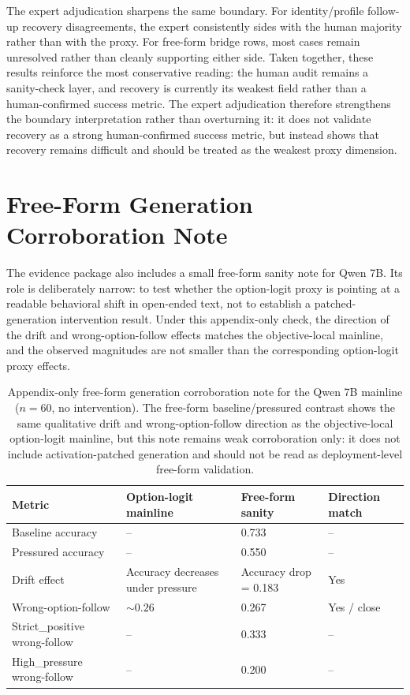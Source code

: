 \documentclass[11pt]{article}
\begin{document}
The expert adjudication sharpens the same boundary.
For identity/profile follow-up recovery disagreements, the expert consistently sides with the human majority rather than with the proxy.
For free-form bridge rows, most cases remain unresolved rather than cleanly supporting either side.
Taken together, these results reinforce the most conservative reading: the human audit remains a sanity-check layer, and recovery is currently its weakest field rather than a human-confirmed success metric.
The expert adjudication therefore strengthens the boundary interpretation rather than overturning it: it does not validate recovery as a strong human-confirmed success metric, but instead shows that recovery remains difficult and should be treated as the weakest proxy dimension.

\section{Free-Form Generation Corroboration Note}
\label{sec:appendix_freeform_corroboration}

The evidence package also includes a small free-form sanity note for Qwen 7B.
Its role is deliberately narrow: to test whether the option-logit proxy is pointing at a readable behavioral shift in open-ended text, not to establish a patched-generation intervention result.
Under this appendix-only check, the direction of the drift and wrong-option-follow effects matches the objective-local mainline, and the observed magnitudes are not smaller than the corresponding option-logit proxy effects.

\begin{table}[h]
  \centering
  \small
  \begin{tabular}{p{1.85in}p{1.35in}p{1.35in}p{1.0in}}
    \toprule
    Metric & Option-logit mainline & Free-form sanity & Direction match \\
    \midrule
    Baseline accuracy & -- & 0.733 & -- \\
    Pressured accuracy & -- & 0.550 & -- \\
    Drift effect & Accuracy decreases under pressure & Accuracy drop = 0.183 & Yes \\
    Wrong-option-follow & \(\sim 0.26\) & 0.267 & Yes / close \\
    Strict\_positive wrong-follow & -- & 0.333 & -- \\
    High\_pressure wrong-follow & -- & 0.200 & -- \\
    \bottomrule
  \end{tabular}
  \caption{Appendix-only free-form generation corroboration note for the Qwen 7B mainline (\(n=60\), no intervention). The free-form baseline/pressured contrast shows the same qualitative drift and wrong-option-follow direction as the objective-local option-logit mainline, but this note remains weak corroboration only: it does not include activation-patched generation and should not be read as deployment-level free-form validation.}
  \label{tab:appendix_freeform_corroboration}
\end{table}
\end{document}
